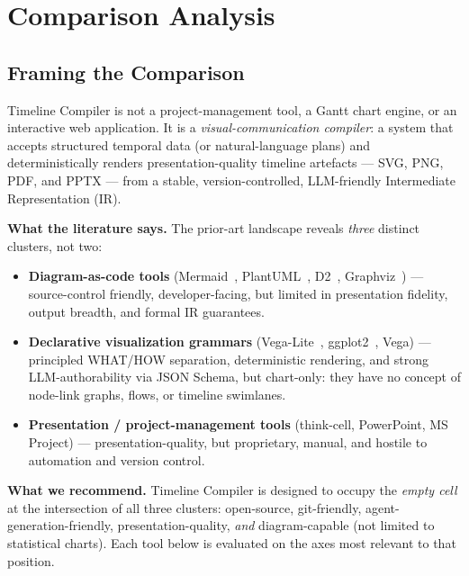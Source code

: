 
\section{Comparison Analysis}
\label{sec:comparison}

\subsection{Framing the Comparison}

Timeline Compiler is not a project-management tool, a Gantt chart engine,
or an interactive web application.
It is a \emph{visual-communication compiler}: a system that accepts structured
temporal data (or natural-language plans) and deterministically renders
presentation-quality timeline artefacts --- SVG, PNG, PDF, and PPTX --- from
a stable, version-controlled, LLM-friendly Intermediate Representation (IR).

\medskip\noindent
\textbf{What the literature says.}
The prior-art landscape reveals \emph{three} distinct clusters, not two:

\begin{itemize}
  \item \textbf{Diagram-as-code tools} (Mermaid~\cite{mermaid2023},
        PlantUML~\cite{plantuml}, D2~\cite{d2lang}, Graphviz~\cite{graphviz})
        --- source-control friendly, developer-facing, but limited in
        presentation fidelity, output breadth, and formal IR guarantees.
  \item \textbf{Declarative visualization grammars}
        (Vega-Lite~\cite{vegalite2017}, ggplot2~\cite{layeredgrammar2010},
        Vega) --- principled WHAT/HOW separation, deterministic rendering, and
        strong LLM-authorability via JSON Schema, but chart-only: they have
        no concept of node-link graphs, flows, or timeline swimlanes.
  \item \textbf{Presentation / project-management tools} (think-cell,
        PowerPoint, MS Project) --- presentation-quality, but proprietary,
        manual, and hostile to automation and version control.
\end{itemize}

\medskip\noindent
\textbf{What we recommend.}
Timeline Compiler is designed to occupy the \emph{empty cell} at the
intersection of all three clusters: open-source, git-friendly,
agent-generation-friendly, presentation-quality, \emph{and} diagram-capable
(not limited to statistical charts).
Each tool below is evaluated on the axes most relevant to that position.

